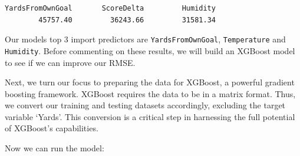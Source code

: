 \documentclass[
  super,
  preprint,
  3p]{elsarticle}
\newenvironment{Shaded}{\begin{snugshade}}{\end{snugshade}}
\newcommand{\AttributeTok}[1]{\textcolor[rgb]{0.40,0.45,0.13}{#1}}
\newcommand{\CommentTok}[1]{\textcolor[rgb]{0.37,0.37,0.37}{#1}}
\newcommand{\FunctionTok}[1]{\textcolor[rgb]{0.28,0.35,0.67}{#1}}
\newcommand{\NormalTok}[1]{\textcolor[rgb]{0.00,0.23,0.31}{#1}}
\newcommand{\OtherTok}[1]{\textcolor[rgb]{0.00,0.23,0.31}{#1}}
\newcommand{\SpecialCharTok}[1]{\textcolor[rgb]{0.37,0.37,0.37}{#1}}
\newcommand{\StringTok}[1]{\textcolor[rgb]{0.13,0.47,0.30}{#1}}
\begin{document}
\begin{verbatim}
YardsFromOwnGoal       ScoreDelta         Humidity 
        45757.40         36243.66         31581.34 
\end{verbatim}

Our models top 3 import predictors are \texttt{YardsFromOwnGoal},
\texttt{Temperature} and \texttt{Humidity}. Before commenting on these
results, we will build an XGBoost model to see if we can improve our
RMSE.

Next, we turn our focus to preparing the data for XGBoost, a powerful
gradient boosting framework. XGBoost requires the data to be in a matrix
format. Thus, we convert our training and testing datasets accordingly,
excluding the target variable `Yards'. This conversion is a critical
step in harnessing the full potential of XGBoost's capabilities.

\begin{Shaded}
\end{Shaded}

Now we can run the model:
\end{document}
